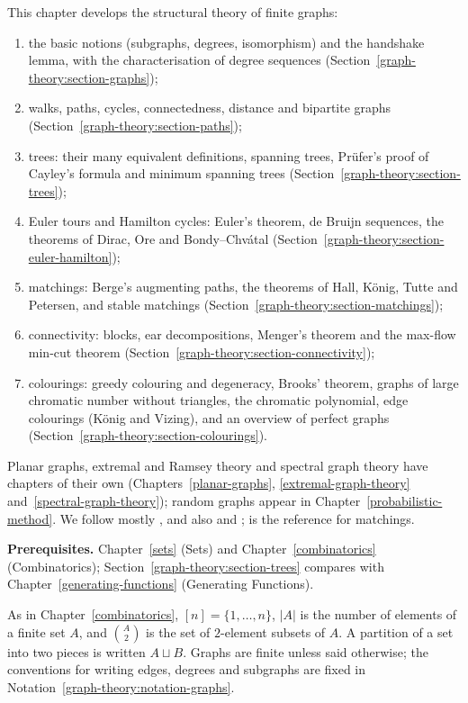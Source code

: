 This chapter develops the structural theory of finite graphs:
\begin{enumerate}
\item the basic notions (subgraphs, degrees, isomorphism) and the handshake lemma, with the characterisation of degree sequences (Section~\ref{graph-theory:section-graphs});
\item walks, paths, cycles, connectedness, distance and bipartite graphs (Section~\ref{graph-theory:section-paths});
\item trees: their many equivalent definitions, spanning trees, Pr\"ufer's proof of Cayley's formula and minimum spanning trees (Section~\ref{graph-theory:section-trees});
\item Euler tours and Hamilton cycles: Euler's theorem, de Bruijn sequences, the theorems of Dirac, Ore and Bondy--Chv\'atal (Section~\ref{graph-theory:section-euler-hamilton});
\item matchings: Berge's augmenting paths, the theorems of Hall, K\"onig, Tutte and Petersen, and stable matchings (Section~\ref{graph-theory:section-matchings});
\item connectivity: blocks, ear decompositions, Menger's theorem and the max-flow min-cut theorem (Section~\ref{graph-theory:section-connectivity});
\item colourings: greedy colouring and degeneracy, Brooks' theorem, graphs of large chromatic number without triangles, the chromatic polynomial, edge colourings (K\"onig and Vizing),
and an overview of perfect graphs (Section~\ref{graph-theory:section-colourings}).
\end{enumerate}
Planar graphs, extremal and Ramsey theory and spectral graph theory have chapters of their own (Chapters~\ref{planar-graphs}, \ref{extremal-graph-theory}
and~\ref{spectral-graph-theory}); random graphs appear in Chapter~\ref{probabilistic-method}. We follow mostly \cite{diestel-graph-theory}, and also \cite{bondy-murty} and \cite{west-graph-theory};
\cite{lovasz-plummer} is the reference for matchings.

\noindent\textbf{Prerequisites.} Chapter~\ref{sets} (Sets) and Chapter~\ref{combinatorics} (Combinatorics); Section~\ref{graph-theory:section-trees} compares with
Chapter~\ref{generating-functions} (Generating Functions).

\begin{notation}\label{graph-theory:notation-basic}
As in Chapter~\ref{combinatorics}, $[n] = \{1, \ldots, n\}$, $|A|$ is the number of elements of a finite set $A$, and $\binom{A}{2}$ is the set of $2$-element subsets of $A$. A partition of a
set into two pieces is written $A \sqcup B$. Graphs are finite unless said otherwise; the conventions for writing edges, degrees and subgraphs are fixed in
Notation~\ref{graph-theory:notation-graphs}.
\end{notation}


